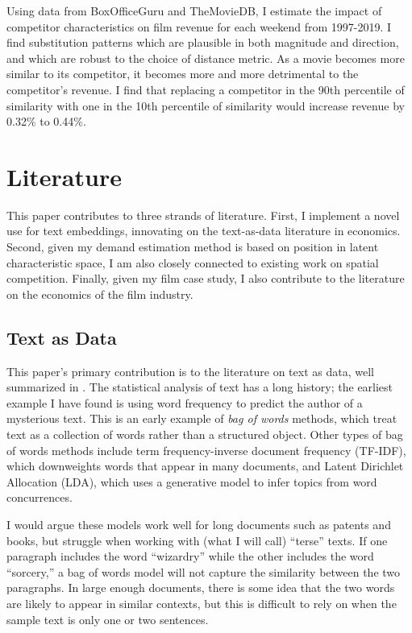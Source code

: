 \documentclass{article}
\begin{document}
Using data from BoxOfficeGuru and TheMovieDB, I estimate the impact of competitor characteristics on film revenue for each weekend from 1997-2019. I find substitution patterns which are plausible in both magnitude and direction, and which are robust to the choice of distance metric. As a movie becomes more similar to its competitor, it becomes more and more detrimental to the competitor's revenue. I find that replacing a competitor in the 90th percentile of similarity with one in the 10th percentile of similarity would increase revenue by 0.32\% to 0.44\%.

\section{Literature}

This paper contributes to three strands of literature. First, I implement a novel use for text embeddings, innovating on the text-as-data literature in economics. Second, given my demand estimation method is based on position in latent characteristic space, I am also closely connected to existing work on spatial competition. Finally, given my film case study, I also contribute to the literature on the economics of the film industry. 

\subsection{Text as Data}

This paper's primary contribution is to the literature on text as data, well summarized in \textcite{gentzkow2019EL}. The statistical analysis of text has a long history; the earliest example I have found is \textcite{mendenhall1887S} using word frequency to predict the author of a mysterious text. This is an early example of \emph{bag of words} methods, which treat text as a collection of words rather than a structured object. Other types of bag of words methods include term frequency-inverse document frequency (TF-IDF), which downweights words that appear in many documents, and Latent Dirichlet Allocation (LDA), which uses a generative model to infer topics from word concurrences.

I would argue these models work well for long documents such as patents and books, but struggle when working with (what I will call) ``terse'' texts. If one paragraph includes the word ``wizardry'' while the other includes the word ``sorcery,'' a bag of words model will not capture the similarity between the two paragraphs. In large enough documents, there is some idea that the two words are likely to appear in similar contexts, but this is difficult to rely on when the sample text is only one or two sentences. 
\end{document}
